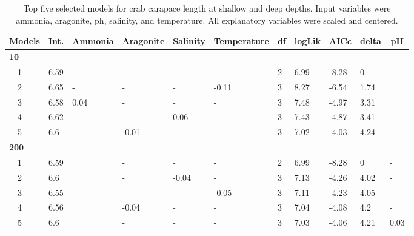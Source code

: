 \documentclass[letterpaper,12pt]{article}\usepackage[]{graphicx}\usepackage[]{color}
\begin{document}
\begin{table}[!tbp]
{\footnotesize
\caption{Top five selected models for crab carapace length at shallow and deep depths. Input variables were ammonia, aragonite, ph, salinity, and temperature.  All explanatory variables were scaled and centered.\label{tab:cltab}} 
\begin{center}
\begin{tabular}{lllllllllll}
\hline\hline
\multicolumn{1}{l}{Models}&\multicolumn{1}{c}{Int.}&\multicolumn{1}{c}{Ammonia}&\multicolumn{1}{c}{Aragonite}&\multicolumn{1}{c}{Salinity}&\multicolumn{1}{c}{Temperature}&\multicolumn{1}{c}{df}&\multicolumn{1}{c}{logLik}&\multicolumn{1}{c}{AICc}&\multicolumn{1}{c}{delta}&\multicolumn{1}{c}{pH}\tabularnewline
\hline
{\bfseries 10}&&&&&&&&&&\tabularnewline
~~1&6.59&-&-&-&-&2&6.99&-8.28&0&\tabularnewline
~~2&6.65&-&-&-&-0.11&3&8.27&-6.54&1.74&\tabularnewline
~~3&6.58&0.04&-&-&-&3&7.48&-4.97&3.31&\tabularnewline
~~4&6.62&-&-&0.06&-&3&7.43&-4.87&3.41&\tabularnewline
~~5&6.6&-&-0.01&-&-&3&7.02&-4.03&4.24&\tabularnewline
\hline
{\bfseries 200}&&&&&&&&&&\tabularnewline
~~1&6.59&&-&-&-&2&6.99&-8.28&0&-\tabularnewline
~~2&6.6&&-&-0.04&-&3&7.13&-4.26&4.02&-\tabularnewline
~~3&6.55&&-&-&-0.05&3&7.11&-4.23&4.05&-\tabularnewline
~~4&6.56&&-0.04&-&-&3&7.04&-4.08&4.2&-\tabularnewline
~~5&6.6&&-&-&-&3&7.03&-4.06&4.21&0.03\tabularnewline
\hline
\end{tabular}\end{center}}
\end{table}
\end{document}
